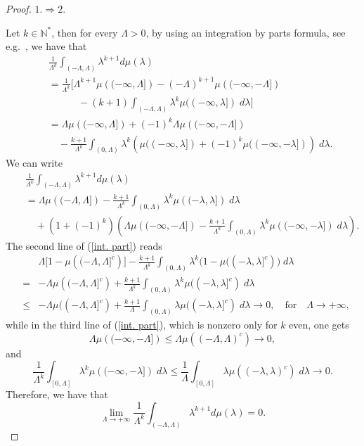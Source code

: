 \documentclass[aip,jmp,12pt
]{revtex4}
\newcommand{\NM}{\mathbb{N}}
\theoremstyle{definition}
\begin{document}
\begin{proof}
\quad\newline

$1. \Rightarrow 2.$

Let $k \in \NM^*$, then for every $\Lambda >0$, by using an integration by parts formula, see e.g.\ \cite{Riesz}, we have that
\begin{eqnarray*}
& &\frac{1}{\Lambda^{k}} \int_{(-\Lambda,\Lambda)} \lambda^{k+1} d\mu(\lambda) \nonumber\\
& & =  \frac{1}{\Lambda^{k}} \Big[ \Lambda^{k+1} \mu\left((-\infty,\Lambda]\right)-(-\Lambda)^{k+1}\mu\left((-\infty,-\Lambda]\right)
\nonumber\\
& &\quad\qquad -(k+1) \int_{(-\Lambda,\Lambda)}\lambda^{k} \mu ((-\infty, \lambda]) \; d \lambda \Big] \nonumber\\
& & = \Lambda \mu\left((-\infty,\Lambda]\right)+(-1)^{k}\Lambda\mu\left((-\infty,-\Lambda]\right) \nonumber \\
& & \quad -\frac{k+1}{\Lambda^{k}} \int_{(0,\Lambda)}\lambda^{k} \left(\mu ((-\infty, \lambda])+(-1)^{k}\mu((-\infty, -\lambda])\right) \; d \lambda.
\end{eqnarray*}
We can write
\begin{eqnarray}
& &\frac{1}{\Lambda^{k}} \int_{(-\Lambda,\Lambda)} \lambda^{k+1} d\mu(\lambda) \nonumber\\
& & = \Lambda \mu \left( (-\Lambda,\Lambda] \right)-\frac{k+1}{\Lambda^k}\int_{(0,\Lambda)}\lambda^k \mu\left((-\lambda,\lambda]\right) \; d \lambda \nonumber\\
&  &\quad + \left(1+(-1)^k\right)\left(\Lambda \mu \left( (-\infty,-\Lambda] \right)-\frac{k+1}{\Lambda^k}\int_{(0,\Lambda)}\lambda^k \mu\left((-\infty,-\lambda] \right) \; d \lambda \right).
\label{int. part}
\end{eqnarray}
The second line of (\ref {int. part}) reads
\begin{eqnarray*}
&  & \Lambda \Big[1-\mu \left( (-\Lambda,\Lambda]^c \right) \Big] -\frac{k+1}{\Lambda^k}\int_{(0,\Lambda)}\lambda^k \Big( 1-\mu ((-\lambda,\lambda]^c)\Big) \; d \lambda \nonumber\\
& = & 
- \Lambda \mu \left( (-\Lambda,\Lambda]^c \right)
+ \frac{k+1}{\Lambda^k} \int_{(0,\Lambda)}\lambda^k \mu ((-\lambda,\lambda]^c) \; d \lambda \nonumber\\
& \leq & - \Lambda \mu ( (-\Lambda,\Lambda]^c) + \frac{k+1}{\Lambda} \int_{(0,\Lambda)}\lambda \mu ((-\lambda,\lambda]^c) \; d \lambda  \to 0, \quad \textrm{for} \quad \Lambda \to +\infty,
\end{eqnarray*}
while in the third line of (\ref {int. part}), which is nonzero only for $k$ even, one gets
$$
\Lambda \mu \left( (-\infty,-\Lambda] \right) \leq \Lambda \mu \left( (-\Lambda,\Lambda)^c \right) \to 0,
$$
and
$$
\frac{1}{\Lambda^k}\int_{[0,\Lambda]}\lambda^k \mu\left((-\infty,-\lambda]\right) \; d \lambda
\leq \frac{1}{\Lambda}\int_{[0,\Lambda]}\lambda \mu\left((-\lambda,\lambda)^c\right) \; d \lambda
\to 0.
$$
Therefore, we have that
$$
\lim_{\Lambda \to +\infty} \frac{1}{\Lambda^{k}} \int_{(-\Lambda,\Lambda)} \lambda^{k+1} d\mu(\lambda)=0.
$$


\end{proof}
\end{document}
